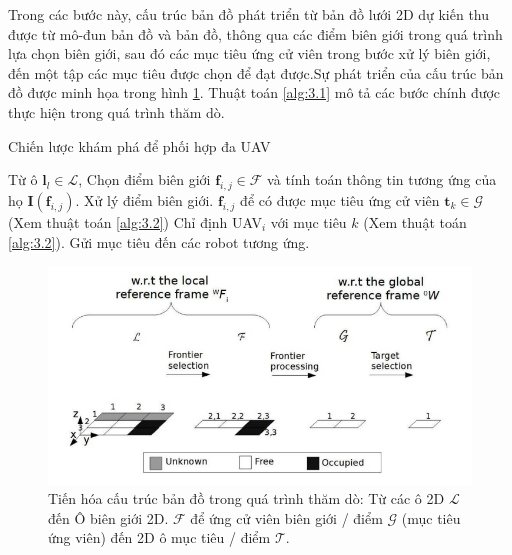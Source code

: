 \documentclass[11pt,openany]{book}
\begin{document}
Trong các bước này, cấu trúc bản đồ phát triển từ bản đồ lưới 2D dự kiến thu được từ mô-đun bản đồ và bản đồ, thông qua các điểm biên giới trong quá trình lựa chọn biên giới, sau đó các mục tiêu ứng cử viên trong bước xử lý biên giới, đến một tập các mục tiêu được chọn để đạt được.Sự phát triển của cấu trúc bản đồ được minh họa trong hình \ref{fig:3.2}. Thuật toán \ref{alg:3.1} mô tả các bước chính được thực hiện trong quá trình thăm dò.
\begin{algorithm}
    \caption{Chiến lược khám phá để phối hợp đa UAV}
    \label{alg:3.1}
    \begin{algorithm}[1]
        \STATE Từ ô $\mathbf{l}_l \in \mathcal{L}$, Chọn điểm biên giới $\mathbf{f}_{i,j} \in \mathcal{F}$ và tính toán thông tin tương ứng của họ $\mathit{\mathbf{I}}(\mathbf{f}_{i,j})$.
        \STATE Xử lý điểm biên giới. $\mathbf{f}_{i,j}$ để có được mục tiêu ứng cử viên $\mathbf{t}_k \in \mathcal{G}$ (Xem thuật toán \ref{alg:3.2})
        \STATE Chỉ định UAV$_i$ với mục tiêu $k$ (Xem thuật toán \ref{alg:3.2}).
        \STATE Gửi mục tiêu đến các robot tương ứng.
    \end{algorithm}
\end{algorithm}
\begin{figure}[H]
    \centering
    \includegraphics[scale=0.4]{assets/3_2.png}
    \caption{Tiến hóa cấu trúc bản đồ trong quá trình thăm dò: Từ các ô 2D $\mathcal{L}$ đến Ô biên giới 2D. $\mathcal{F}$ để ứng cử viên biên giới / điểm $\mathcal{G}$ (mục tiêu ứng viên) đến 2D ô mục tiêu / điểm $\mathcal{T}$.}
    \label{fig:3.2}
\end{figure}
\end{document}
